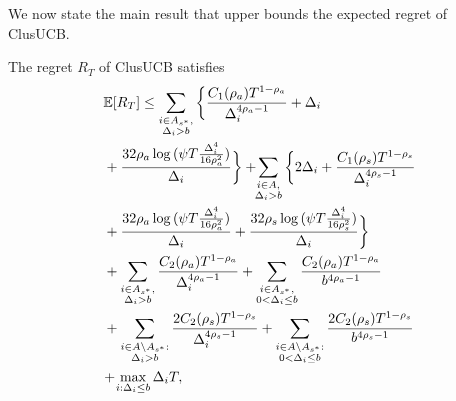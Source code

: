 	
We now state the main result that upper bounds the expected regret of ClusUCB.
	
\begin{theorem}
\label{Result:Theorem:1}
The regret $R_T$ of ClusUCB satisfies
\begin{align*}
&\mathbb{E} [R_{T}]\leq 
\sum\limits_{\substack{i\in A_{s^{*}},\\\Delta_{i} > b}}\bigg\lbrace \frac{C_1(\rho_{a})T^{1-\rho_{a}}}{\Delta_{i}^{4\rho_{a}-1}} + \Delta_{i}\\
& + \frac{32\rho_{a}\log{(\psi T\frac{\Delta_{i}^{4}}{16\rho_{a}^{2}})}}{\Delta_{i}} \bigg\rbrace
 + \! \! \sum\limits_{\substack{i\in A,\\\Delta_{i} > b}} \bigg\lbrace 2\Delta_{i}+
\frac{C_1(\rho_{s})T^{1-\rho_{s}}}{\Delta_{i}^{4\rho_{s}-1}} \\
&+ \frac{32\rho_{a}\log{(\psi T\frac{\Delta_{i}^{4}}{16\rho_{a}^{2}})}}{\Delta_{i}} 
+ \frac{32\rho_{s}\log{(\psi T\frac{\Delta_{i}^{4}}{16\rho_{s}^{2}})}}{\Delta_{i}}\bigg\rbrace \\
&+ \sum\limits_{\substack{i\in A_{s^{*}},\\ \Delta_{i} > b}} 
\frac{C_2(\rho_{a})T^{1-\rho_{a}}}{\Delta_{i}^{4\rho_{a}-1}}
+\sum\limits_{\substack{i\in A_{s^{*}},\\0 < \Delta_{i}\leq b}}\frac{C_2(\rho_a)T^{1-\rho_{a}}}{b^{4\rho_{a} -1}}\\ 
&+ \sum_{\substack{i\in A\setminus A_{s^*}:\\\Delta_{i}> b}}\frac{2C_{2}(\rho_{s})T^{1-\rho_{s}}}{\Delta_{i}^{4\rho_{s}-1}} +\sum_{\substack{i\in A \setminus A_{s^*}:\\ 0 < \Delta_{i} \leq b}}\frac{2C_{2}(\rho_{s})T^{1-\rho_{s}}}{b^{4\rho_{s}-1}}\\
& \!+\! \max\limits_{i:\Delta_{i}\leq b}\Delta_{i}T, 
\end{align*}

\end{theorem}
